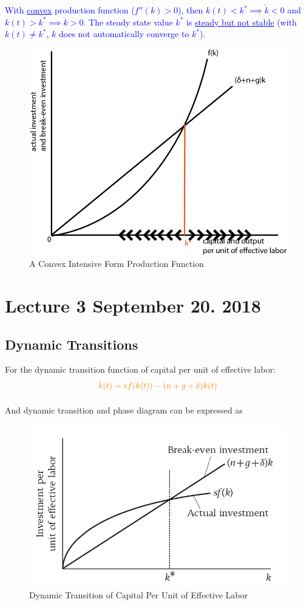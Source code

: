 \documentclass[11pt]{article}
\begin{document}
				\begin{remark}
					\textcolor{blue}{
					With \ul{convex} production function ($f''(k) > 0$), then $k(t) < k^* \implies \dot{k} < 0$ and $k(t) > k^* \implies \dot{k} > 0$. The steady state value $k^*$ is \ul{steady but not stable} (with $k(t) \neq k^*$, $k$ does not automatically converge to $k^*$).
					}
				\end{remark}
				\begin{figure}[H]
					\centering
					\includegraphics[width=0.7\linewidth]{figures/convex_prod_func.png}
					\caption{A Convex Intensive Form Production Function}
				\end{figure}
	
	\section{Lecture 3 September 20. 2018}
		\subsection{Dynamic Transitions}
			\begin{remark}
				For the dynamic transition function of capital per unit of effective labor:
				\begin{equation}
				\textcolor{orange}{
					\dot{k}(t) = sf(k(t)) - (n+g+\delta)k(t)
					}
				\end{equation}
			\end{remark}
			\paragraph{} And dynamic transition and phase diagram can be expressed as
			\begin{figure}[h]
				\centering
				\includegraphics[width=0.6\linewidth]{figures/3_1.png}
				\caption{Dynamic Transition of Capital Per Unit of Effective Labor}
			\end{figure}
			
\end{document}
